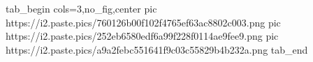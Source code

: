  
 
 
 
 
\qqSecCmtScr

\ifcmt
  tab_begin cols=3,no_fig,center
     pic https://i2.paste.pics/760126b00f102f4765ef63ac8802c003.png
		 pic https://i2.paste.pics/252eb6580edf6a99f228f0114ae9fee9.png
		 pic https://i2.paste.pics/a9a2febc551641f9c03c55829b4b232a.png
  tab_end
\fi
